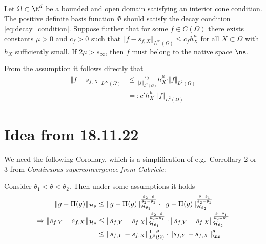 \documentclass[a4paper, 10pt]{article}
\begin{document}
\begin{theorem}
\label{th:inverse_statement_improved}
Let $\Omega \subset \R^d$ be a bounded and open domain satisfying an interior cone condition. 
The positive definite basis function $\Phi$ should satisfy the decay condition \ref{eq:decay_condition}. 
Suppose further that for some $f \in C(\Omega)$ there exists constants $\mu > 0$ and $c_f > 0$ such that $\Vert f - s_{f, X}\Vert_{L^\infty(\Omega)} \leq c_f h_X^\mu$ for all $X \subset \Omega$ with $h_X$ sufficiently small. 
If $2\mu > s_\infty$, then $f$ must belong to the native space $\ns$.
\end{theorem}

From the assumption it follows directly that
\begin{align*}
\Vert f - s_{f, X}\Vert_{L^\infty(\Omega)} &\leq \frac{c_f}{\Vert f \Vert_{L^2(\Omega)}} h_X^\mu \cdot \Vert f \Vert_{L^2(\Omega)} \\ 
&=: c' h_X^\mu \cdot \Vert f \Vert_{L^2(\Omega)}
\end{align*}



\section{Idea from 18.11.22}


We need the following Corollary, which is a simplification of e.g.\ Corrollary 2 or 3 from \textit{Continuous superconvergence from Gabriele}:
\begin{cor}
%
Consider $\theta_1 < \theta < \theta_2$. Then under some assumptions it holds 
\begin{align}
%
\Vert g - \Pi(g) \Vert_{\mathcal{H}_{\theta}} &\leq \Vert g - \Pi(g) \Vert_{\mathcal{H}_{\theta_1}}^{\frac{\theta_2 - \theta}{\theta_2 - \theta_1}} \cdot \Vert g - \Pi(g) \Vert_{\mathcal{H}_{\theta_2}}^{\frac{\theta - \theta_1}{\theta_2 - \theta_1}} \notag \\
\Rightarrow \Vert s_{f, Y} - s_{f, X} \Vert_{\mathcal{H}_{\theta}} &\leq \Vert s_{f, Y} - s_{f, X} \Vert_{\mathcal{H}_{\theta_1}}^{\frac{\theta_2 - \theta}{\theta_2 - \theta_1}} \cdot \Vert s_{f, Y} - s_{f, X} \Vert_{\mathcal{H}_{\theta_2}}^{\frac{\theta - \theta_1}{\theta_2 - \theta_1}} \notag \\
&\leq \Vert s_{f, Y} - s_{f, X} \Vert_{L^2(\Omega)}^{1 - \theta} \cdot \Vert s_{f, Y} - s_{f, X} \Vert_{\ns}^{\theta}
\end{align}
\end{cor}
\end{document}
